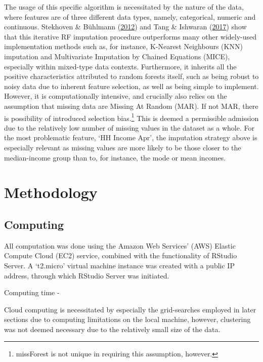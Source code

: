 \documentclass[11pt,preprint, authoryear]{elsarticle}
\numberwithin{equation}{section}
\numberwithin{figure}{section}
\numberwithin{table}{section}
\let\rmarkdownfootnote\footnote%
\def\footnote{\protect\rmarkdownfootnote}
\begin{document}
The usage of this specific algorithm is necessitated by the nature of
the data, where features are of three different data types, namely,
categorical, numeric and continuous. Stekhoven \& Bühlmann
(\protect\hyperlink{ref-stekhoven2012missforest}{2012}) and Tang \&
Ishwaran (\protect\hyperlink{ref-tang2017random}{2017}) show that this
iterative RF imputation procedure outperforms many other widely-used
implementation methods such as, for instance, K-Nearest Neighbours (KNN)
imputation and Multivariate Imputation by Chained Equations (MICE),
especially within mixed-type data contexts. Furthermore, it inherits all
the positive characteristics attributed to random forests itself, such
as being robust to noisy data due to inherent feature selection, as well
as being simple to implement. However, it is computationally intensive,
and crucially also relies on the assumption that missing data are
Missing At Random (MAR). If not MAR, there is possibility of introduced
selection bias.\footnote{missForest is not unique in requiring this
  assumption, however.} This is deemed a permissible admission due to
the relatively low number of missing values in the dataset as a whole.
For the most problematic feature, `HH Income Apr', the imputation
strategy above is especially relevant as missing values are more likely
to be those closer to the median-income group than to, for instance, the
mode or mean incomes.

\hypertarget{methodology}{%
\section{\texorpdfstring{Methodology
\label{Meth}}{Methodology }}\label{methodology}}

\hypertarget{computing}{%
\subsection*{Computing}\label{computing}}

All computation was done using the Amazon Web Services' (AWS) Elastic
Compute Cloud (EC2) service, combined with the functionality of RStudio
Server. A `t2.micro' virtual machine instance was created with a public
IP address, through which RStudio Server was initiated.

Computing time -

Cloud computing is necessitated by especially the grid-searches employed
in later sections due to computing limitations on the local machine,
however, clustering was not deemed necessary due to the relatively small
size of the data.
\end{document}
